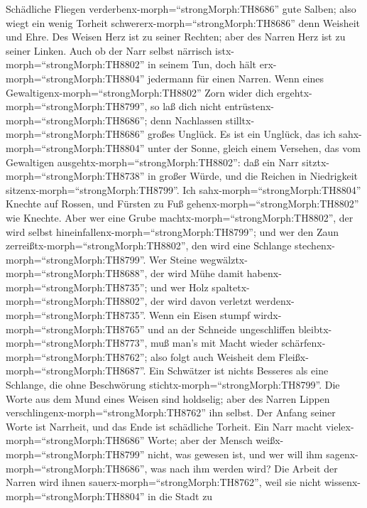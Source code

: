  Schädliche Fliegen verderbenx-morph=``strongMorph:TH8686''
gute Salben; also wiegt ein wenig Torheit
schwererx-morph=``strongMorph:TH8686'' denn Weisheit und Ehre.
 Des Weisen Herz ist zu seiner Rechten; aber des Narren Herz
ist zu seiner Linken.  Auch ob der Narr selbst närrisch
istx-morph=``strongMorph:TH8802'' in seinem Tun, doch hält
erx-morph=``strongMorph:TH8804'' jedermann für einen Narren.
 Wenn eines Gewaltigenx-morph=``strongMorph:TH8802'' Zorn
wider dich ergehtx-morph=``strongMorph:TH8799'', so laß dich nicht
entrüstenx-morph=``strongMorph:TH8686''; denn Nachlassen
stilltx-morph=``strongMorph:TH8686'' großes Unglück.  Es ist
ein Unglück, das ich sahx-morph=``strongMorph:TH8804'' unter der Sonne,
gleich einem Versehen, das vom Gewaltigen
ausgehtx-morph=``strongMorph:TH8802'':  daß ein Narr
sitztx-morph=``strongMorph:TH8738'' in großer Würde, und die Reichen in
Niedrigkeit sitzenx-morph=``strongMorph:TH8799''.  Ich
sahx-morph=``strongMorph:TH8804'' Knechte auf Rossen, und Fürsten zu Fuß
gehenx-morph=``strongMorph:TH8802'' wie Knechte.  Aber wer
eine Grube machtx-morph=``strongMorph:TH8802'', der wird selbst
hineinfallenx-morph=``strongMorph:TH8799''; und wer den Zaun
zerreißtx-morph=``strongMorph:TH8802'', den wird eine Schlange
stechenx-morph=``strongMorph:TH8799''.  Wer Steine
wegwälztx-morph=``strongMorph:TH8688'', der wird Mühe damit
habenx-morph=``strongMorph:TH8735''; und wer Holz
spaltetx-morph=``strongMorph:TH8802'', der wird davon verletzt
werdenx-morph=``strongMorph:TH8735''.  Wenn ein Eisen
stumpf wirdx-morph=``strongMorph:TH8765'' und an der Schneide
ungeschliffen bleibtx-morph=``strongMorph:TH8773'', muß man's mit Macht
wieder schärfenx-morph=``strongMorph:TH8762''; also folgt auch Weisheit
dem Fleißx-morph=``strongMorph:TH8687''.  Ein Schwätzer ist
nichts Besseres als eine Schlange, die ohne Beschwörung
stichtx-morph=``strongMorph:TH8799''.  Die Worte aus dem
Mund eines Weisen sind holdselig; aber des Narren Lippen
verschlingenx-morph=``strongMorph:TH8762'' ihn selbst.  Der
Anfang seiner Worte ist Narrheit, und das Ende ist schädliche Torheit.
 Ein Narr macht vielex-morph=``strongMorph:TH8686'' Worte;
aber der Mensch weißx-morph=``strongMorph:TH8799'' nicht, was gewesen
ist, und wer will ihm sagenx-morph=``strongMorph:TH8686'', was nach ihm
werden wird?  Die Arbeit der Narren wird ihnen
sauerx-morph=``strongMorph:TH8762'', weil sie nicht
wissenx-morph=``strongMorph:TH8804'' in die Stadt zu
